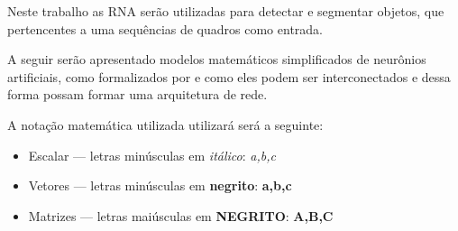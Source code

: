 \documentclass[
	12pt,				%
    oneside,			%
	a4paper,			%
	english,			%
	french,				%
	spanish,			%
	brazil,				%
	]{abntex2}
\begin{document}


Neste trabalho as RNA serão utilizadas para detectar e segmentar objetos, que pertencentes a uma sequências de quadros como entrada. 


A seguir serão apresentado modelos matemáticos simplificados de neurônios artificiais, como formalizados por  e como eles podem ser interconectados e dessa forma possam formar uma arquitetura de rede. 

A notação matemática utilizada utilizará será a seguinte:

\begin{itemize}
 
\item Escalar  — letras minúsculas em \textit{itálico}: \textit{a,b,c}
\item Vetores  — letras minúsculas em \textbf{negrito}: \textbf{a,b,c}
\item Matrizes — letras maiúsculas em \textbf{NEGRITO}: \textbf{A,B,C} 

\end{itemize}
\end{document}
